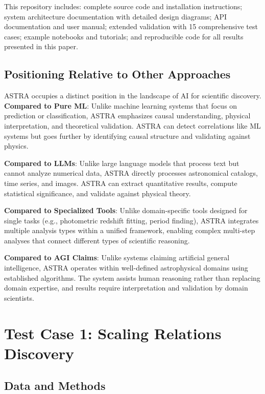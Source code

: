 \documentclass[usenatbib]{rasti}
\begin{document}
This repository includes: complete source code and installation instructions; system architecture documentation with detailed design diagrams; API documentation and user manual; extended validation with 15 comprehensive test cases; example notebooks and tutorials; and reproducible code for all results presented in this paper.

\subsection{Positioning Relative to Other Approaches}

ASTRA occupies a distinct position in the landscape of AI for scientific discovery. \textbf{Compared to Pure ML}: Unlike machine learning systems that focus on prediction or classification, ASTRA emphasizes causal understanding, physical interpretation, and theoretical validation. ASTRA can detect correlations like ML systems but goes further by identifying causal structure and validating against physics.

\textbf{Compared to LLMs}: Unlike large language models that process text but cannot analyze numerical data, ASTRA directly processes astronomical catalogs, time series, and images. ASTRA can extract quantitative results, compute statistical significance, and validate against physical theory.

\textbf{Compared to Specialized Tools}: Unlike domain-specific tools designed for single tasks (e.g., photometric redshift fitting, period finding), ASTRA integrates multiple analysis types within a unified framework, enabling complex multi-step analyses that connect different types of scientific reasoning.

\textbf{Compared to AGI Claims}: Unlike systems claiming artificial general intelligence, ASTRA operates within well-defined astrophysical domains using established algorithms. The system assists human reasoning rather than replacing domain expertise, and results require interpretation and validation by domain scientists.

\section{Test Case 1: Scaling Relations Discovery}

\subsection{Data and Methods}
\end{document}
